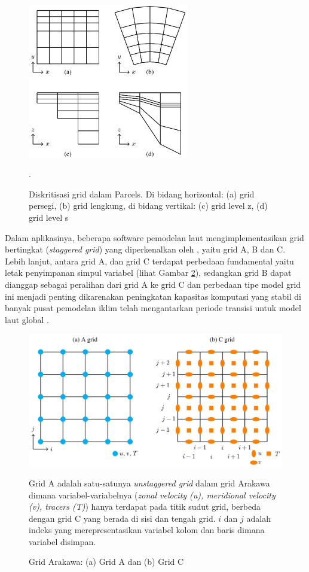 \begin{spacing}{1.5}
	\begin{figure}[H]
		\centering
		\includegraphics[width=7cm]{contents/grid.jpg}
		\caption{Diskritisasi grid dalam Parcels. Di bidang horizontal: (a) grid persegi, (b) grid lengkung, di bidang vertikal: (c) grid level z, (d) grid level s \protect{}}.
		\label{fig:grid}
	\end{figure}
	
	Dalam aplikasinya, beberapa software pemodelan laut mengimplementasikan grid bertingkat (\textit{staggered grid}) yang diperkenalkan oleh , yaitu grid A, B dan C. Lebih lanjut, antara grid A, dan grid C terdapat perbedaan fundamental yaitu letak penyimpanan simpul variabel (lihat Gambar \ref{fig:arakawa}), sedangkan grid B dapat dianggap sebagai peralihan dari grid A ke grid C dan perbedaan tipe model grid ini menjadi penting dikarenakan peningkatan kapasitas komputasi yang stabil di banyak pusat pemodelan iklim telah mengantarkan periode transisi untuk model laut global  . 
	
	\begin{figure}[H]
		\centering
		\includegraphics[width=13cm]{contents/arakawa.jpg}
		\caption{Grid Arakawa: (a) Grid A dan (b) Grid C \protect{}}
		\label{fig:arakawa}
		\medspace
		\small
		Grid A adalah satu-satunya \textit{unstaggered grid} dalam grid Arakawa dimana variabel-variabelnya (\textit{zonal velocity (u), meridional velocity (v), tracers (T)}) hanya terdapat pada titik sudut grid, berbeda dengan grid C yang berada di sisi dan tengah grid. $i$ dan $j$ adalah indeks yang merepresentasikan variabel kolom dan baris dimana variabel disimpan.
	\end{figure}

\end{spacing}
